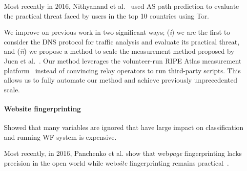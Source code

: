 Most recently in 2016, Nithyanand et al.~\cite{Nithyanand2016a} used AS path
prediction to evaluate the practical threat faced by users in the top 10
countries using Tor.

We improve on previous work in two significant ways; (\emph{i}) we are the
first to consider the DNS protocol for traffic analysis and evaluate its
practical threat, and (\emph{ii}) we propose a method to scale the measurement
method proposed by Juen et al.~\cite{Juen2015a}.  Our method leverages the
volunteer-run RIPE Atlas measurement platform~\cite{atlas} instead of
convincing relay operators to run third-party scripts.  This allows us to fully
automate our method and achieve previously unprecedented scale.

\paragraph{Website fingerprinting}
\cite{Juarez2014a}
Showed that many variables are ignored that have large impact on classification
and running WF system is expensive.

Most recently, in 2016, Panchenko et al. show that web\emph{page}
fingerprinting lacks precision in the open world while web\emph{site}
fingerprinting remains practical~\cite{Panchenko2016a}.
